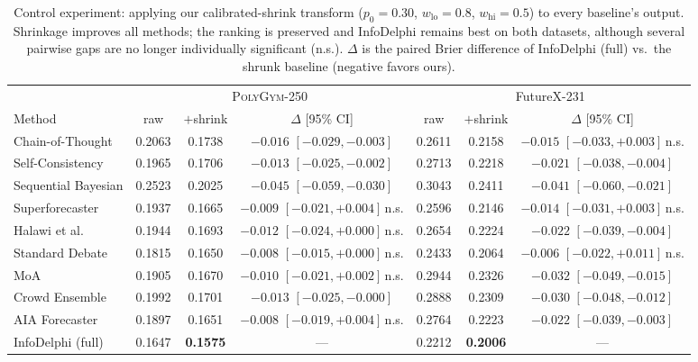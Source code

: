 \begin{table}[t]
\centering
\small
\caption{Control experiment: applying our calibrated-shrink transform ($p_0{=}0.30$, $w_{\mathrm{lo}}{=}0.8$, $w_{\mathrm{hi}}{=}0.5$) to every baseline's output. Shrinkage improves all methods; the ranking is preserved and InfoDelphi remains best on both datasets, although several pairwise gaps are no longer individually significant (n.s.). $\Delta$ is the paired Brier difference of InfoDelphi (full) vs.\ the shrunk baseline (negative favors ours).}
\label{tab:shrink_control}
\begin{tabular}{lcccccc}
\toprule
 & \multicolumn{3}{c}{\textsc{PolyGym}-250} & \multicolumn{3}{c}{FutureX-231} \\
\cmidrule(lr){2-4}\cmidrule(lr){5-7}
Method & raw & $+$shrink & $\Delta$ [95\% CI] & raw & $+$shrink & $\Delta$ [95\% CI] \\
\midrule
Chain-of-Thought & 0.2063 & 0.1738 & $-0.016$ $[-0.029, -0.003]$ & 0.2611 & 0.2158 & $-0.015$ $[-0.033, +0.003]$\,n.s. \\
Self-Consistency & 0.1965 & 0.1706 & $-0.013$ $[-0.025, -0.002]$ & 0.2713 & 0.2218 & $-0.021$ $[-0.038, -0.004]$ \\
Sequential Bayesian & 0.2523 & 0.2025 & $-0.045$ $[-0.059, -0.030]$ & 0.3043 & 0.2411 & $-0.041$ $[-0.060, -0.021]$ \\
Superforecaster & 0.1937 & 0.1665 & $-0.009$ $[-0.021, +0.004]$\,n.s. & 0.2596 & 0.2146 & $-0.014$ $[-0.031, +0.003]$\,n.s. \\
Halawi et al. & 0.1944 & 0.1693 & $-0.012$ $[-0.024, +0.000]$\,n.s. & 0.2654 & 0.2224 & $-0.022$ $[-0.039, -0.004]$ \\
Standard Debate & 0.1815 & 0.1650 & $-0.008$ $[-0.015, +0.000]$\,n.s. & 0.2433 & 0.2064 & $-0.006$ $[-0.022, +0.011]$\,n.s. \\
MoA & 0.1905 & 0.1670 & $-0.010$ $[-0.021, +0.002]$\,n.s. & 0.2944 & 0.2326 & $-0.032$ $[-0.049, -0.015]$ \\
Crowd Ensemble & 0.1992 & 0.1701 & $-0.013$ $[-0.025, -0.000]$ & 0.2888 & 0.2309 & $-0.030$ $[-0.048, -0.012]$ \\
AIA Forecaster & 0.1897 & 0.1651 & $-0.008$ $[-0.019, +0.004]$\,n.s. & 0.2764 & 0.2223 & $-0.022$ $[-0.039, -0.003]$ \\
\midrule
InfoDelphi (full) & 0.1647 & \textbf{0.1575} & --- & 0.2212 & \textbf{0.2006} & --- \\
\bottomrule
\end{tabular}
\end{table}
